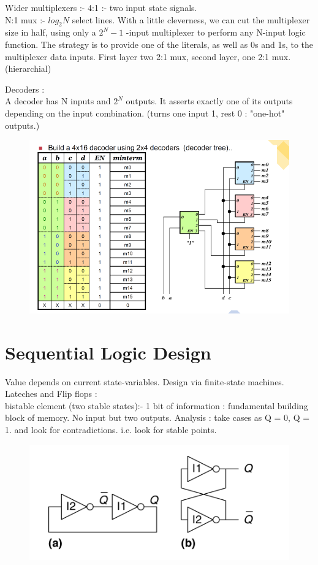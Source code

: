 \documentclass{article}[12pt]
\begin{document}
Wider multiplexers :- 4:1 :- two input state signals. \\
N:1 mux :- $log_{2}N$ select lines.
With a little cleverness, we can cut the multiplexer size in half, using
only a $2^N-1$ -input multiplexer to perform any N-input logic function.
The strategy is to provide one of the literals, as well as 0s and 1s, to the
multiplexer data inputs. First layer two 2:1 mux, second layer, one 2:1 mux. (hierarchial)

Decoders : \\ 
A decoder has N inputs and $2^N$ outputs. It asserts exactly one of its
outputs depending on the input combination. (turns one input 1, rest 0 : "one-hot" outputs.)
\begin{figure}[htbp]
\centerline{\includegraphics[scale = 0.3]{../Images/dec-tree.png}}
\end{figure}

\section{Sequential Logic Design}
Value depends on current state-variables. Design via finite-state machines. \\ 
Lateches and Flip flops : \\
bistable element (two stable states):- 1 bit of information : fundamental building block of memory. No input but two outputs. 
Analysis : take cases as Q = 0, Q = 1. and look for contradictions. i.e. look for stable points.
\begin{figure}[htbp]
\centerline{\includegraphics[scale = 0.3]{../Images/mem.png}}
\end{figure}
\end{document}
